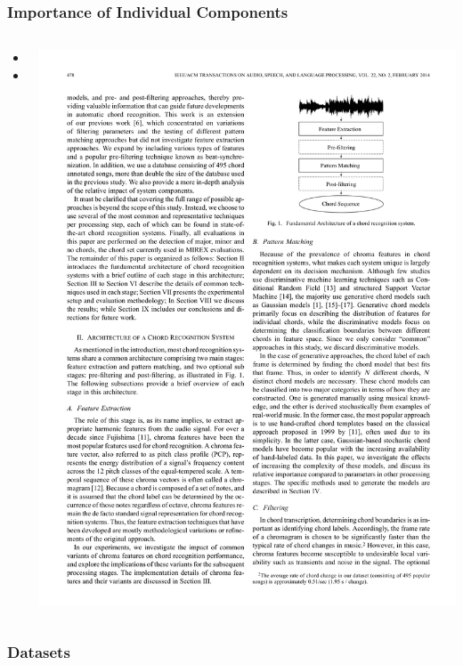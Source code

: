 \documentclass{beamer}
\begin{document}
\begin{frame}
  \frametitle{Importance of Individual Components}
    \begin{columns}
	\begin{column}{.6\textwidth}
	\begin{itemize}
		\item 
		\item 
	\end{itemize}
	\end{column}
	\begin{column}{.4\textwidth}
  \includegraphics[width=.95\textwidth]{fig3.pdf}
  	\end{column}
  	\end{columns}
\end{frame}

\begin{frame}
	\frametitle{Datasets}
\end{frame}  
\end{document}
